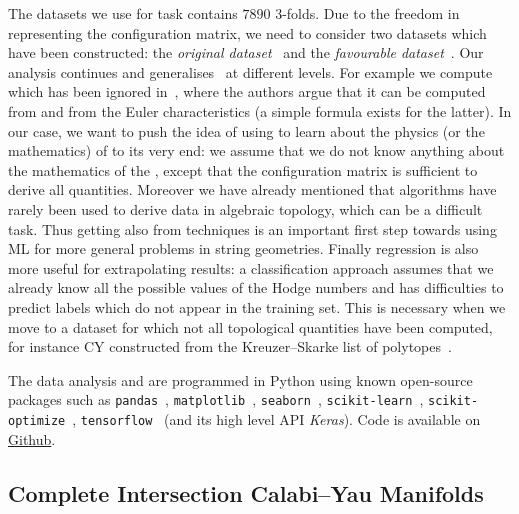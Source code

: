 The datasets we use for task contains $7890$ \cicy $3$-folds.
Due to the freedom in representing the configuration matrix, we need to consider two datasets which have been constructed: the \emph{original dataset}~\cite{Candelas:1988:CompleteIntersectionCalabiYau, Green:1989:AllHodgeNumbers} and the \emph{favourable dataset}~\cite{Anderson:2017:FibrationsCICYThreefolds}.
Our analysis continues and generalises~\cite{He:2017:MachinelearningStringLandscape, Bull:2018:MachineLearningCICY} at different levels.
For example we compute  which has been ignored in~\cite{He:2017:MachinelearningStringLandscape, Bull:2018:MachineLearningCICY}, where the authors argue that it can be computed from  and from the Euler characteristics (a simple formula exists for the latter).
In our case, we want to push the idea of using \ml to learn about the physics (or the mathematics) of \cy to its very end: we assume that we do not know anything about the mathematics of the \cicy, except that the configuration matrix is sufficient to derive all quantities.
Moreover we have already mentioned that \ml algorithms have rarely been used to derive data in algebraic topology, which can be a difficult task.
Thus getting also  from \ml techniques is an important first step towards using ML for more general problems in string geometries.
Finally regression is also more useful for extrapolating results: a classification approach assumes that we already know all the possible values of the Hodge numbers and has difficulties to predict labels which do not appear in the training set.
This is necessary when we move to a dataset for which not all topological quantities have been computed, for instance CY constructed from the Kreuzer--Skarke list of polytopes~\cite{Kreuzer:2000:CompleteClassificationReflexive}.

The data analysis and \ml are programmed in Python using known open-source packages such as \texttt{pandas}~\cite{WesMcKinney:2010:DataStructuresStatistical}, \texttt{matplotlib}~\cite{Hunter:2007:Matplotlib2DGraphics}, \texttt{seaborn}~\cite{Waskom:2020:MwaskomSeabornV0}, \texttt{scikit-learn}~\cite{Pedregosa:2011:ScikitlearnMachineLearning}, \texttt{scikit-optimize}~\cite{Head:2020:ScikitoptimizeScikitoptimize}, \texttt{tensorflow}~\cite{Abadi:2015:TensorFlowLargescaleMachine} (and its high level API \emph{Keras}).
Code is available on \href{https://thesfinox.github.io/ml-cicy/}{Github}.


\subsection{Complete Intersection Calabi--Yau Manifolds}
\label{sec:data:cy}

